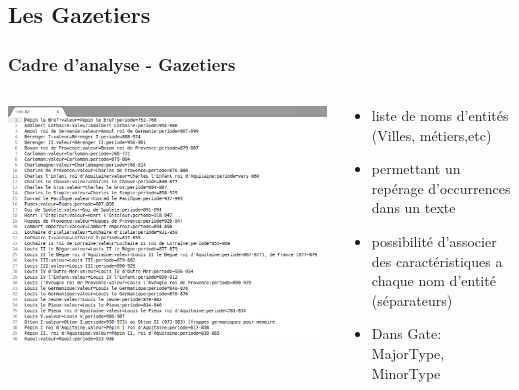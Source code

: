\documentclass[10pt, compress]{beamer}
\begin{document}
\subsection{Les Gazetiers}
\begin{frame}[fragile]
\frametitle{Cadre d'analyse - Gazetiers}
\begin{columns}
		\includegraphics[scale=0.2]{img/Gaz.png} 
	\onslide<1>
		\begin{scriptsize}
		\begin{itemize}
			\item{liste de noms d'entités (Villes, métiers,etc)}
			\item{permettant un repérage d’occurrences dans un texte}
			\item{possibilité d'associer des caractéristiques a chaque nom d'entité (séparateurs)}
			\item{Dans Gate: MajorType, MinorType}
		\end{itemize}
		\end{scriptsize}
	\end{columns}
\end{frame}
\end{document}
